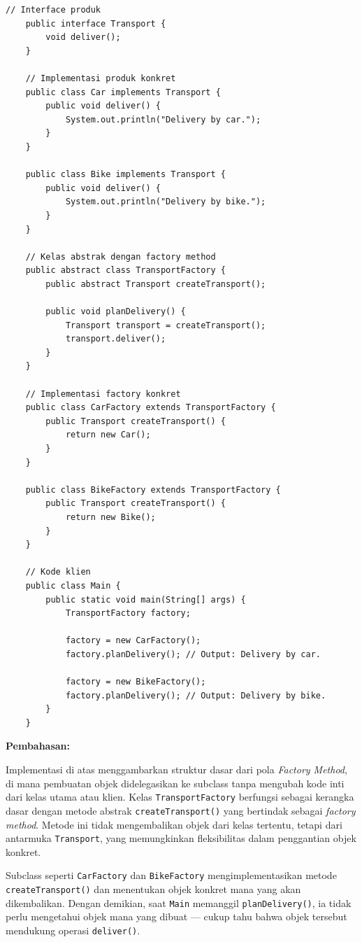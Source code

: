 \begin{lstlisting}[style=JavaStyle]
	// Interface produk
	public interface Transport {
		void deliver();
	}
	
	// Implementasi produk konkret
	public class Car implements Transport {
		public void deliver() {
			System.out.println("Delivery by car.");
		}
	}
	
	public class Bike implements Transport {
		public void deliver() {
			System.out.println("Delivery by bike.");
		}
	}
	
	// Kelas abstrak dengan factory method
	public abstract class TransportFactory {
		public abstract Transport createTransport();
		
		public void planDelivery() {
			Transport transport = createTransport();
			transport.deliver();
		}
	}
	
	// Implementasi factory konkret
	public class CarFactory extends TransportFactory {
		public Transport createTransport() {
			return new Car();
		}
	}
	
	public class BikeFactory extends TransportFactory {
		public Transport createTransport() {
			return new Bike();
		}
	}
	
	// Kode klien
	public class Main {
		public static void main(String[] args) {
			TransportFactory factory;
			
			factory = new CarFactory();
			factory.planDelivery(); // Output: Delivery by car.
			
			factory = new BikeFactory();
			factory.planDelivery(); // Output: Delivery by bike.
		}
	}
\end{lstlisting}

\textbf{Pembahasan:}

Implementasi di atas menggambarkan struktur dasar dari pola \textit{Factory Method}, di mana pembuatan objek didelegasikan ke subclass tanpa mengubah kode inti dari kelas utama atau klien. Kelas \texttt{TransportFactory} berfungsi sebagai kerangka dasar dengan metode abstrak \texttt{createTransport()} yang bertindak sebagai \textit{factory method}. Metode ini tidak mengembalikan objek dari kelas tertentu, tetapi dari antarmuka \texttt{Transport}, yang memungkinkan fleksibilitas dalam penggantian objek konkret.

Subclass seperti \texttt{CarFactory} dan \texttt{BikeFactory} mengimplementasikan metode \texttt{createTransport()} dan menentukan objek konkret mana yang akan dikembalikan. Dengan demikian, saat \texttt{Main} memanggil \texttt{planDelivery()}, ia tidak perlu mengetahui objek mana yang dibuat — cukup tahu bahwa objek tersebut mendukung operasi \texttt{deliver()}.

